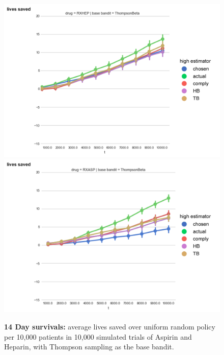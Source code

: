 \begin{figure}
\begin{center}
\includegraphics[width=1\columnwidth]{bandit/figs/fig1-7.jpg}
\includegraphics[width=1\columnwidth]{bandit/figs/fig1-8.jpg}
\caption{\textbf{14 Day survivals:} average lives saved over uniform random policy per 10,000 patients in 10,000 simulated trials of Aspirin and Heparin, with Thompson sampling as the base bandit.}
\label{fig1a}
\end{center}
\end{figure} 



